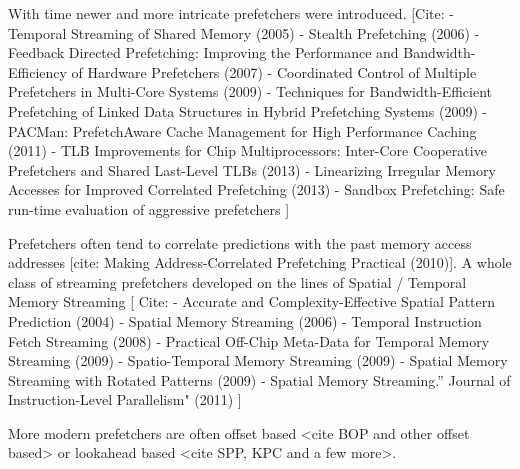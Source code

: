 \documentclass{sig-alternate}
\begin{document}
With time newer and more intricate prefetchers were introduced. [Cite:\newline
- Temporal Streaming of Shared Memory (2005)\newline
- Stealth Prefetching (2006)\newline
- Feedback Directed Prefetching: Improving the Performance and Bandwidth-Efficiency of Hardware Prefetchers (2007)\newline
- Coordinated Control of Multiple Prefetchers in Multi-Core Systems (2009)\newline
- Techniques for Bandwidth-Efficient Prefetching of Linked Data Structures in Hybrid Prefetching Systems (2009)\newline
- PACMan: PrefetchAware Cache Management for High Performance Caching (2011)\newline
- TLB Improvements for Chip Multiprocessors: Inter-Core Cooperative Prefetchers and Shared Last-Level TLBs (2013)\newline
- Linearizing Irregular Memory Accesses for Improved Correlated Prefetching (2013)\newline
- Sandbox Prefetching: Safe run-time evaluation of aggressive prefetchers\newline
]\newline

Prefetchers often tend to correlate predictions with the past memory access addresses [cite: Making Address-Correlated Prefetching Practical (2010)]. 
 A whole class of streaming prefetchers developed on the lines of Spatial / Temporal Memory Streaming
[ Cite:\newline
- Accurate and Complexity-Effective Spatial Pattern Prediction (2004)\newline
- Spatial Memory Streaming (2006)\newline
- Temporal Instruction Fetch Streaming (2008)\newline
- Practical Off-Chip Meta-Data for Temporal Memory Streaming (2009)\newline
- Spatio-Temporal Memory Streaming (2009)\newline
- Spatial Memory Streaming with Rotated Patterns (2009)\newline
- Spatial Memory Streaming.” Journal of Instruction-Level Parallelism" (2011)\newline
]\newline

More modern prefetchers are often offset based <cite BOP and other offset based> or lookahead based <cite SPP, KPC and a few more>.
\end{document}
